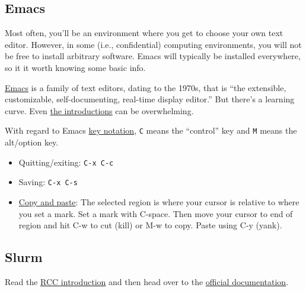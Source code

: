 \subsection{Emacs}

Most often, you'll be an environment where you get to choose your own text editor.
However, in some (i.e., confidential) computing environments, you will not be free to install arbitrary software.
Emacs will typically be installed everywhere, so it it worth knowing some basic info.

\href{https://en.wikipedia.org/wiki/Emacs}{Emacs} is a family of text editors, dating to the 1970s, that is ``the extensible, customizable, self-documenting, real-time display editor.''
But there's a learning curve.
Even \href{https://www.gnu.org/software/emacs/tour/}{the introductions} can be overwhelming.

With regard to Emacs \href{https://www.emacswiki.org/emacs/EmacsKeyNotation}{key notation},
\texttt{C} means the ``control'' key and \texttt{M} means the alt/option key.

\begin{itemize}
	\item Quitting/exiting: \texttt{C-x C-c}
	\item Saving: \texttt{C-x C-s}
	\item \href{https://www.emacswiki.org/emacs/CopyAndPaste}{Copy and paste}: 
	The selected region is where your cursor is relative to where you set a mark.
	Set a mark with C-space.
	Then move your cursor to end of region and hit C-w to cut (kill) or M-w to copy.
	Paste using C-y (yank).

\end{itemize}

\subsection{Slurm}

Read the \href{https://rcc.uchicago.edu/docs/using-midway/index.html#batch-jobs}{RCC introduction} and then head over to the \href{https://slurm.schedmd.com/overview.html}{official documentation}.

